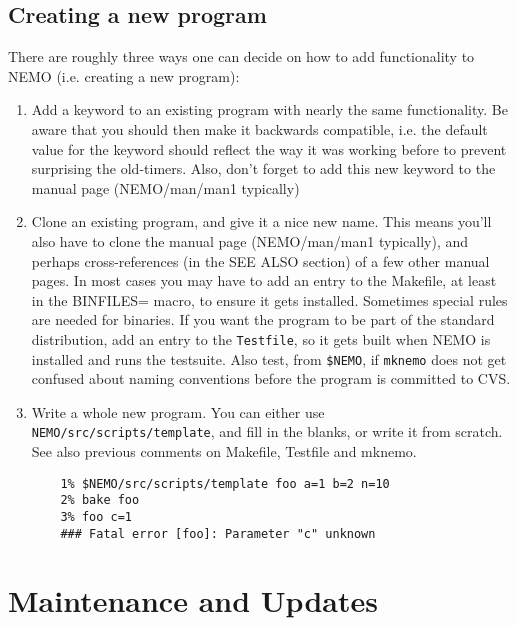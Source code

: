 \section{Creating a new program}

There are roughly three ways one can decide on how to add functionality
to NEMO (i.e. creating a new program):

\begin{enumerate}
\item  Add a keyword to an existing program with nearly the same functionality.
Be aware that you should
then make it backwards compatible, i.e. the default value for the keyword
should reflect the way it was working before to prevent surprising the
old-timers.  Also, don't forget to add
this new keyword to the manual page (NEMO/man/man1 typically)

\item
Clone an existing program, and give it a nice new name. This means you'll also 
have to clone the manual page (NEMO/man/man1 typically), 
and perhaps cross-references (in the SEE ALSO section) of a few other manual
pages. In most cases you may have to add an entry to the Makefile,
at least in the BINFILES= macro, to ensure it gets installed.
Sometimes special rules are needed for binaries.
If you want the program to be part of the standard distribution, add
an entry to the {\tt Testfile}, so it gets built when NEMO is installed
and runs the testsuite.
Also test, from {\tt \$NEMO}, if {\tt mknemo}
does not get confused about naming conventions before the program
is committed to CVS.

\item
Write a whole new program. You can either use {\tt NEMO/src/scripts/template},
and fill in the blanks, or write it from scratch. See also 
previous comments on Makefile, Testfile and mknemo.

\footnotesize\begin{verbatim}
    1% $NEMO/src/scripts/template foo a=1 b=2 n=10
    2% bake foo
    3% foo c=1 
    ### Fatal error [foo]: Parameter "c" unknown
\end{verbatim}\normalsize

\end{enumerate}

\chapter                {Maintenance and Updates}


